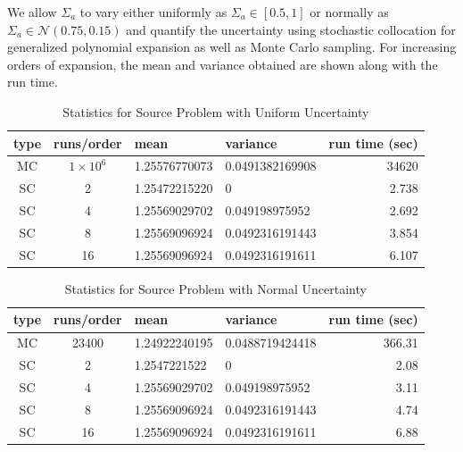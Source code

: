 We allow $\Sigma_a$ to vary either uniformly as $\Sigma_a\in[0.5,1]$ or normally as $\Sigma_a\in\mathcal{N}(0.75,0.15)$ and quantify the uncertainty using stochastic collocation for generalized polynomial expansion as well as Monte Carlo sampling.
For increasing orders of expansion, the mean and variance obtained are shown along with the run time.
\begin{table}
\begin{center}
\begin{tabular}{c c|l l| r}
type & runs/order & mean & variance & run time (sec) \\ \hline
MC & $1\times10^6$ & 1.25576770073 & 0.0491382169908 & 34620\\
SC & 2 & 1.25472215220 & 0 & 2.738\\
SC & 4 & 1.25569029702 & 0.049198975952 & 2.692\\
SC & 8 & 1.25569096924 & 0.0492316191443 & 3.854\\
SC & 16 & 1.25569096924 & 0.0492316191611 & 6.107
\end{tabular}
\end{center}
\caption{Statistics for Source Problem with Uniform Uncertainty}
\end{table}

\begin{table}[h!]
\begin{center}
\begin{tabular}{c c|l l| r}
type & runs/order & mean & variance & run time (sec) \\ \hline
MC & 23400 & 1.24922240195 & 0.0488719424418 & 366.31\\
SC & 2 & 1.2547221522 & 0 & 2.08 \\
SC & 4 & 1.25569029702 & 0.049198975952 & 3.11 \\
SC & 8 & 1.25569096924 & 0.0492316191443 & 4.74\\
SC & 16 & 1.25569096924 & 0.0492316191611 & 6.88
\end{tabular}
\end{center}
\caption{Statistics for Source Problem with Normal Uncertainty}
\end{table}

